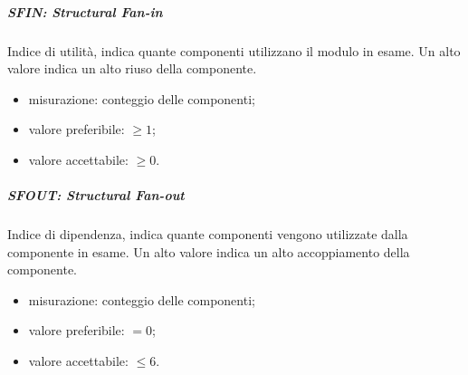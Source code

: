 			\subparagraph{SFIN: Structural Fan-in}
			Indice di utilità, indica quante componenti utilizzano il modulo in esame. Un alto valore indica un alto riuso della componente.
			\begin{itemize}
				\item misurazione: conteggio delle componenti;
				\item valore preferibile: $ \geq 1$;
				\item valore accettabile: $ \geq 0$.
			\end{itemize}
			
			\subparagraph{SFOUT: Structural Fan-out}
			Indice di dipendenza, indica quante componenti vengono utilizzate dalla componente in esame. Un alto valore indica un alto accoppiamento della componente.
			\begin{itemize}
				\item misurazione: conteggio delle componenti;
				\item valore preferibile: $ = 0$;
				\item valore accettabile: $ \leq 6$.
			\end{itemize}
\pagebreak
